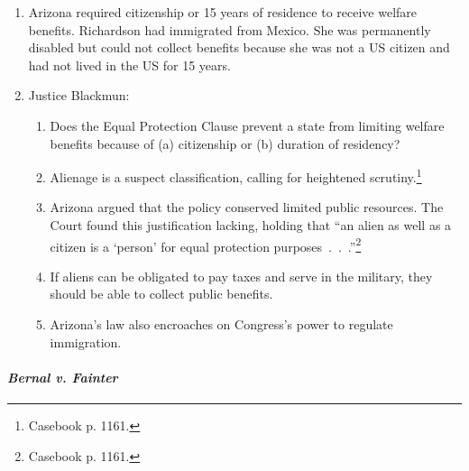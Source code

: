 \begin{enumerate}
    \item Arizona required citizenship or 15 years of residence to receive 
    welfare benefits. Richardson had immigrated from Mexico. She was 
    permanently disabled but could not collect benefits because she was not a 
    US citizen and had not lived in the US for 15 years.
    \item Justice Blackmun:
    \begin{enumerate}
        \item Does the Equal Protection Clause prevent a state from limiting 
        welfare benefits because of (a) citizenship or (b) duration of 
        residency?
        \item Alienage is a suspect classification, calling for heightened 
        scrutiny.\footnote{Casebook p. 1161.}
        \item Arizona argued that the policy conserved limited public 
        resources. The Court found this justification lacking, holding that 
        ``an alien as well as a citizen is a `person' for equal protection 
        purposes~.~.~.''\footnote{Casebook p. 1161.}
        \item If aliens can be obligated to pay taxes and serve in the 
        military, they should be able to collect public benefits.
        \item Arizona's law also encroaches on Congress's power to regulate 
        immigration.
    \end{enumerate}
\end{enumerate}

\paragraph{\emph{Bernal v. Fainter}}

